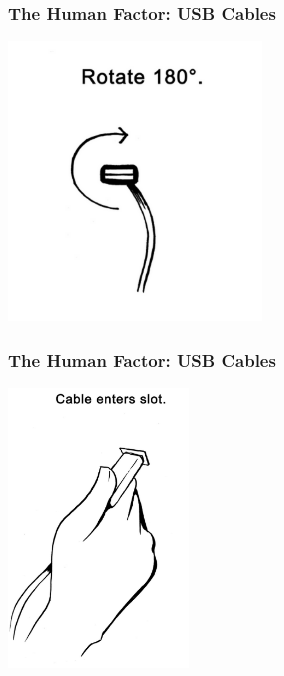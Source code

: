 \begin{frame}
\frametitle{The Human Factor: USB Cables}
\begin{changemargin}{1cm}

\vspace{-0.5em}
\begin{center}
	\includegraphics[height=20em]{images/usb4.png}\\
\end{center}

\end{changemargin}
\end{frame}


\begin{frame}
\frametitle{The Human Factor: USB Cables}
\begin{changemargin}{1cm}

\vspace{-0.5em}
\begin{center}
	\includegraphics[height=20em]{images/usb5.png}\\
\end{center}

\end{changemargin}
\end{frame}


